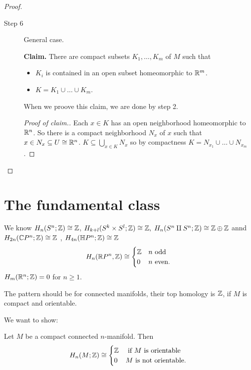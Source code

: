 \documentclass[language=english]{TemplateLecture}
\begin{document}
\begin{proof}
\begin{description}
    \item[Step 6] General case.
    
    \textbf{Claim.} There are compact subsets \(K_1, \dots, K_m\) of \(M\) such that
    \begin{itemize}
        \item \(K_i\) is contained in an open subset homeomorphic to \(\mathbb{R}^m\).
        \item \(K = K_1 \cup \dots \cup K_m\).
    \end{itemize}

    When we proove this claim, we are done by step 2.

    \begin{proof}[Proof of claim.]
        Each \(x \in K\) has an open neighborhood homeomorphic to \(\mathbb{R}^n\). So there is a compact neighborhood \(N_x\) of \(x\) such that \(x \in N_x \subseteq U \cong \mathbb{R}^n\). \(K \subseteq \bigcup_{x \in K} N_x\) so by compactness \(K = N_{x_1} \cup \dots \cup N_{x_m}\).
    \end{proof}
    \end{description}
\end{proof}

\section{The fundamental class}

We know \(H_n(S^n; \mathbb{Z}) \cong \mathbb{Z}\), \(H_{k+l}(S^k \times S^l; \mathbb{Z}) \cong \mathbb{Z}, \; H_n(S^n \amalg S^n; \mathbb{Z}) \cong \mathbb{Z} \oplus \mathbb{Z}\) annd \(H_{2n}(\mathbb{C} P^n; \mathbb{Z}) \cong \mathbb{Z}\)
, \(H_{4n}(\mathbb{H} P^n; \mathbb{Z}) \cong \mathbb{Z}\)
\[H_n(\mathbb{R} P^n, \mathbb{Z}) \cong \begin{cases}
    \mathbb{Z} & n \text{ odd} \\
    0 & n \text{ even.}
\end{cases}\]
\(H_m(\mathbb{R}^n; \mathbb{Z}) = 0\) for \(n \geq 1\).

The pattern should be for connected manifolds, their top homology is \(\mathbb{Z}\), if \(M\) is compact and orientable.

We want to show:
\begin{proposition}
    Let \(M\) be a compact connected \(n\)-manifold. Then
    \[H_n(M; \mathbb{Z}) \cong \begin{cases}
        \mathbb{Z} & \text{ if } M \text{ is orientable} \\
        0 & M \text{ is not orientable.}
    \end{cases}\]
\end{proposition}
\end{document}
